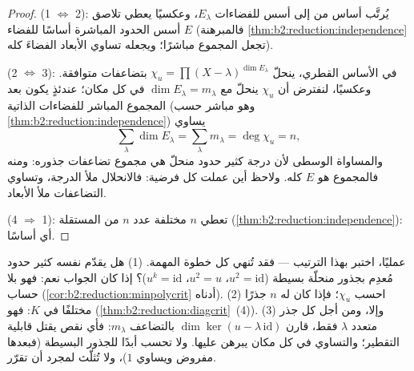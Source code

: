 \begin{proof}
(1 $\iff$ 2): يُرتَّب أساس من  إلى أسس للفضاءات
$E_\lambda$، وعكسيًا يعطي تلاصق أسس الحدود المباشرة
أساسًا للفضاء $E$
(فالمبرهنة \cref{thm:b2:reduction:independence} تجعل المجموع مباشرًا؛ ويجعله تساوي
الأبعاد الفضاءَ كله).

(2 $\iff$ 3): في الأساس القطري، ينحلّ $\chi_u = \prod (X -
\lambda)^{\dim E_\lambda}$ بتضاعفات متوافقة.
وعكسيًا، لنفترض أن $\chi_u$ ينحلّ مع $\dim E_\lambda =
m_\lambda$ في كل مكان؛ عندئذٍ يكون بعد المجموع المباشر للفضاءات الذاتية
(وهو مباشر حسب \cref{thm:b2:reduction:independence}) يساوي
\[
\sum_{\lambda}\dim E_\lambda = \sum_{\lambda} m_\lambda =
\deg\chi_u = n ,
\]
والمساواة الوسطى لأن درجة كثير حدود منحلّ هي مجموع
تضاعفات جذوره: ومنه فالمجموع هو $E$ كله. ولاحظ
أين عملت كل فرضية: فالانحلال ملأ الدرجة،
وتساوي التضاعفات ملأ الأبعاد.

(4 $\Rightarrow$ 1): تعطي $n$  مختلفة عدد $n$ من  المستقلة (\cref{thm:b2:reduction:independence}): أي أساسًا.
\end{proof}

\begin{method}\label{met:b2:reduction:decide}
عمليًا، اختبر بهذا الترتيب --- فقد تُنهي كل خطوة
المهمة. (1) هل يقدّم نفسه كثير حدود مُعدِم بجذور منحلّة
بسيطة ($u^2 = \mathrm{id}$، $u^2 = u$، $u^k =
\mathrm{id}$)؟ إذا كان الجواب نعم: فهو  بلا حساب
(\cref{cor:b2:reduction:minpolycrit} أدناه). (2) احسب
$\chi_u$؛ فإذا كان له $n$ جذرًا مختلفًا في $K$: فهو 
(\cref{thm:b2:reduction:diagcrit}~(4)). (3) وإلا، ومن أجل كل
جذر متعدد $\lambda$ فقط، قارن $\dim\ker(u -
\lambda\,\mathrm{id})$ بالتضاعف $m_\lambda$: فأي
نقص يقتل قابلية التقطير؛ والتساوي في كل مكان يبرهن عليها.
ولا تحسب أبدًا  للجذور البسيطة (فبعدها
مفروض ويساوي $1$)، ولا تُثلّث لمجرد أن تقرّر.
\end{method}

